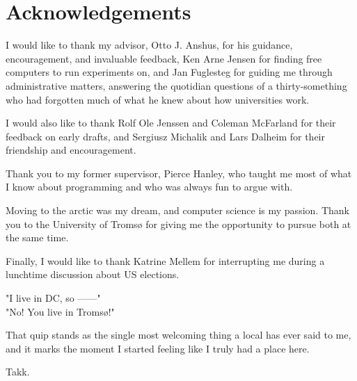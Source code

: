 \chapter{Acknowledgements}

I would like to thank my advisor, Otto J. Anshus, for his guidance,
encouragement, and invaluable feedback, Ken Arne Jensen for finding free
computers to run experiments on, and Jan Fuglesteg for guiding me through
administrative matters, answering the quotidian questions of a thirty-something
who had forgotten much of what he knew about how universities work.

I would also like to thank Rolf Ole Jenssen and Coleman McFarland for their
feedback on early drafts, and Sergiusz Michalik and Lars Dalheim for their
friendship and encouragement.

Thank you to my former supervisor, Pierce Hanley, who taught me most of what I
know about programming and who was always fun to argue with.

Moving to the arctic was my dream, and computer science is my passion.
Thank you to the University of Tromsø for giving me the opportunity to pursue
both at the same time.

Finally, I would like to thank Katrine Mellem for interrupting me during a
lunchtime discussion about US elections.

"I live in DC, so ------"\\
"No! You live in Tromsø!"

That quip stands as the single most welcoming thing a local has ever said to me,
and it marks the moment I started feeling like I truly had a place here.

Takk.
